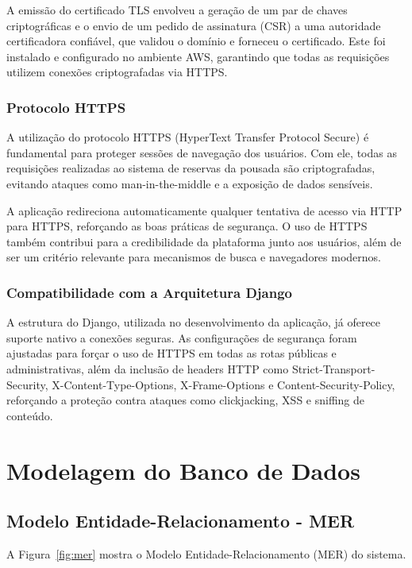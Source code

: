 \documentclass[
	12pt,				%
	openany,			%
	twoside,			%
	a4paper,			%
	english,			%
	french,				%
	spanish,			%
	brazil				%
	]{abntex2}
\begin{document}
A emissão do certificado TLS envolveu a geração de um par de chaves criptográficas e o envio de um pedido de assinatura (CSR) a uma autoridade certificadora confiável, que validou o domínio e forneceu o certificado. Este foi instalado e configurado no ambiente AWS, garantindo que todas as requisições utilizem conexões criptografadas via HTTPS.

\subsubsection{Protocolo HTTPS}
A utilização do protocolo HTTPS (HyperText Transfer Protocol Secure) é fundamental para proteger sessões de navegação dos usuários. Com ele, todas as requisições realizadas ao sistema de reservas da pousada são criptografadas, evitando ataques como man-in-the-middle e a exposição de dados sensíveis.

A aplicação redireciona automaticamente qualquer tentativa de acesso via HTTP para HTTPS, reforçando as boas práticas de segurança. O uso de HTTPS também contribui para a credibilidade da plataforma junto aos usuários, além de ser um critério relevante para mecanismos de busca e navegadores modernos.

\subsubsection{Compatibilidade com a Arquitetura Django}
A estrutura do Django, utilizada no desenvolvimento da aplicação, já oferece suporte nativo a conexões seguras. As configurações de segurança foram ajustadas para forçar o uso de HTTPS em todas as rotas públicas e administrativas, além da inclusão de headers HTTP como Strict-Transport-Security, X-Content-Type-Options, X-Frame-Options e Content-Security-Policy, reforçando a proteção contra ataques como clickjacking, XSS e sniffing de conteúdo.

\section{Modelagem do Banco de Dados}
\subsection{Modelo Entidade-Relacionamento - MER}

A Figura~\ref{fig:mer} mostra o Modelo Entidade-Relacionamento (MER) do sistema.
\end{document}
